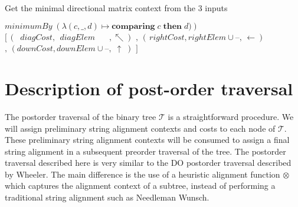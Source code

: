 \documentclass[11pt]{article}
\begin{document}
\begin{algorithm}
  \caption{Get the minimal directional matrix context from the $3$ inputs}\label{getMinimal}
  \begin{algorithmic}[1]
      \State \Return $minimumBy \; \left(\lambda \left(c, \_, d \right) \mapsto \textbf{comparing}\; c \; \textbf{then} \; d)\right)$\newline\hspace*{3.85cm}
      $[\, \left(\;\;diagCost, \;\,diagElem   \quad\;\;\,   ,      \nwarrow    \right)$\newline\hspace*{3.85cm}
      $,\, \left(\, rightCost,    rightElem \cup \textbf{--}, \, \leftarrow    \right)$\newline\hspace*{3.85cm}
      $,\, \left(    downCost,     downElem \cup \textbf{--}, \;   \uparrow \; \right)$\newline\hspace*{3.85cm}
      $]$
    \EndFunction  
  \end{algorithmic}
\end{algorithm}


\section{Description of post-order traversal}
The postorder traversal of the binary tree $\mathcal{T}$ is a straightforward procedure.
We will assign preliminary string alignment contexts and costs to each node of $\mathcal{T}$.
These preliminary string alignment contexts will be consumed to assign a final string alignment in a subsequent preorder traversal of the tree.
The postorder traversal described here is very similar to the  DO postorder traversal described by Wheeler.
The main difference is the use of a heuristic alignment function $\otimes$ which captures the alignment context of a subtree, instead of performing a traditional string alignment such as Needleman Wunsch.
\end{document}
